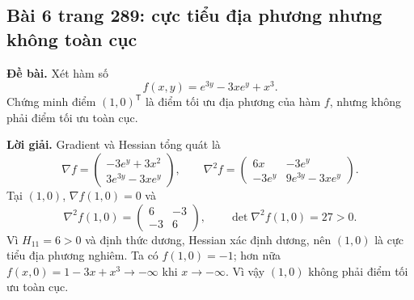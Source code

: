 \documentclass[11pt,a4paper]{article}
\newcommand{\grad}{\nabla}
\newcommand{\Hess}{\nabla^2}
\newcommand{\T}{^{\mathsf T}}
\begin{document}
\clearpage
\begin{samepage}
\subsection{Bài 6 trang 289: cực tiểu địa phương nhưng không toàn cục}
\textbf{Đề bài.} Xét hàm số
\[
f(x,y)=e^{3y}-3xe^y+x^3.
\]
Chứng minh điểm \((1,0)\T\) là điểm tối ưu địa phương của hàm \(f\), nhưng không phải điểm tối ưu toàn cục.

\textbf{Lời giải.} Gradient và Hessian tổng quát là
\[
\grad f=
\begin{pmatrix}
-3e^y+3x^2\\
3e^{3y}-3xe^y
\end{pmatrix},\qquad
\Hess f=
\begin{pmatrix}
6x & -3e^y\\
-3e^y & 9e^{3y}-3xe^y
\end{pmatrix}.
\]
Tại \((1,0)\), \(\grad f(1,0)=0\) và
\[
\Hess f(1,0)=\begin{pmatrix}6&-3\\-3&6\end{pmatrix},
\qquad \det\Hess f(1,0)=27>0.
\]
Vì \(H_{11}=6>0\) và định thức dương, Hessian xác định dương, nên \((1,0)\) là cực tiểu địa phương nghiêm. Ta có \(f(1,0)=-1\); hơn nữa \(f(x,0)=1-3x+x^3\to-\infty\) khi \(x\to-\infty\). Vì vậy \((1,0)\) không phải điểm tối ưu toàn cục.

\end{samepage}
\clearpage
\end{document}

